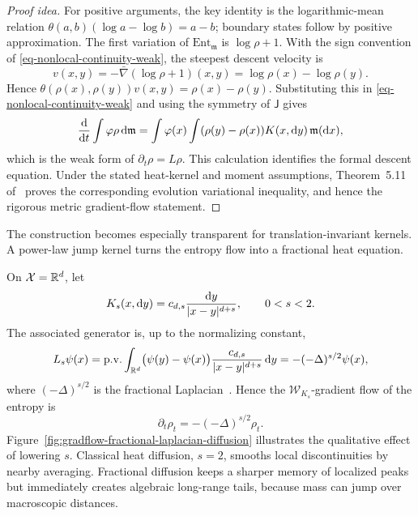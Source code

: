 \begin{proof}[Proof idea]
	For positive arguments, the key identity is the logarithmic-mean relation
	\(\theta(a,b)(\log a-\log b)=a-b\); boundary states follow by positive approximation.
	The first variation of \(\mathrm{Ent}_{\mathfrak m}\) is \(\log\rho+1\). With the sign convention of \eqref{eq-nonlocal-continuity-weak}, the steepest descent velocity is
	\[
		v(x,y)
		=
		-\bar\nabla(\log\rho+1)(x,y)
		=
		\log\rho(x)-\log\rho(y).
	\]
	Hence \(\theta(\rho(x),\rho(y))v(x,y)=\rho(x)-\rho(y)\). Substituting this in \eqref{eq-nonlocal-continuity-weak} and using the symmetry of \(\mathsf J\) gives
	\[
		\frac{\mathrm{d}}{\mathrm{d} t}\int \varphi\rho\,\mathrm{d}\mathfrak m
		=
		\int \varphi(x)\int(\rho(y)-\rho(x))K(x,\mathrm{d} y)\,\mathfrak m(\mathrm{d} x),
	\]
	which is the weak form of \(\partial_t\rho=L\rho\). This calculation identifies the formal descent equation. Under the stated heat-kernel and moment assumptions, Theorem~5.11 of~\cite{Erbar2012JumpEntropy} proves the corresponding evolution variational inequality, and hence the rigorous metric gradient-flow statement.
\end{proof}

The construction becomes especially transparent for translation-invariant kernels. A power-law jump kernel turns the entropy flow into a fractional heat equation.

On \(\mathcal X=\mathbb{R}^d\), let
\[
	K_s(x,\mathrm{d} y)
	=
	c_{d,s}\frac{\mathrm{d} y}{|x-y|^{d+s}},
	\qquad
	0<s<2.
\]
The associated generator is, up to the normalizing constant,
\[
	L_s\psi(x)
	=
	\mathrm{p.v.}\int_{\mathbb{R}^d}
	\bigl(\psi(y)-\psi(x)\bigr)
	\frac{c_{d,s}}{|x-y|^{d+s}}\,\mathrm{d} y
	=
	-(-\Delta)^{s/2}\psi(x),
\]
where \((-\Delta)^{s/2}\) is the fractional Laplacian~\cite{samko1993fractional}. Hence the \(\mathcal W_{K_s}\)-gradient flow of the entropy is
\begin{equation}\label{eq-fractional-heat-nonlocal-wasserstein}
	\partial_t\rho_t
	=
	-(-\Delta)^{s/2}\rho_t.
\end{equation}
Figure~\ref{fig:gradflow-fractional-laplacian-diffusion} illustrates the qualitative effect of lowering \(s\). Classical heat diffusion, \(s=2\), smooths local discontinuities by nearby averaging. Fractional diffusion keeps a sharper memory of localized peaks but immediately creates algebraic long-range tails, because mass can jump over macroscopic distances.

